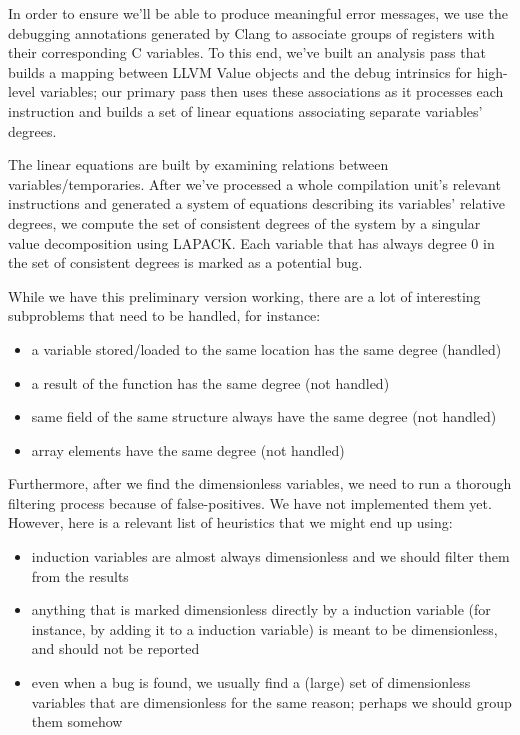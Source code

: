 \documentclass[12pt]{article}
\begin{document}
In order to ensure we'll be able to produce meaningful error messages, we use the debugging annotations generated by Clang to associate groups of registers with their corresponding C variables.
To this end, we've built an analysis pass that builds a mapping between LLVM Value objects and the debug intrinsics for high-level variables; our primary pass then uses these associations as it processes each instruction and builds a set of linear equations associating separate variables' degrees.

The linear equations are built by examining relations between variables/temporaries. After we've processed a whole compilation unit's relevant instructions and generated a system of equations describing its variables' relative degrees, we compute the set of consistent degrees of the system by a singular value decomposition using LAPACK. Each variable that has always degree 0 in the set of consistent degrees is marked as a potential bug.

While we have this preliminary version working, there are a lot of interesting subproblems that need to be handled, for instance:
\begin{itemize}
  \item a variable stored/loaded to the same location has the same degree (handled)
  \item a result of the function has the same degree (not handled)
  \item same field of the same structure always have the same degree (not handled)
  \item array elements have the same degree (not handled)
\end{itemize}

Furthermore, after we find the dimensionless variables, we need to run a thorough filtering process because of false-positives. We have not implemented them yet. However, here is a relevant list of heuristics that we might end up using:
\begin{itemize}
  \item induction variables are almost always dimensionless and we should filter them from the results
  \item anything that is marked dimensionless directly by a induction variable (for instance, by adding it to a induction variable) is meant to be dimensionless, and should not be reported
  \item even when a bug is found, we usually find a (large) set of dimensionless variables that are dimensionless for the same reason; perhaps we should group them somehow
\end{itemize}
\end{document}
